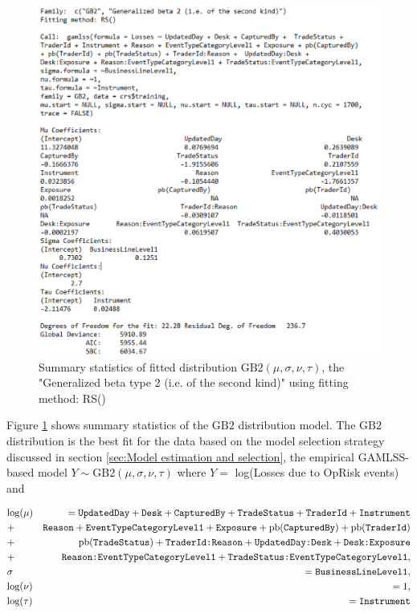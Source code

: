 \documentclass{DissertateUSU}
\begin{document}
\begin{figure}
\centering
\includegraphics[scale=0.9]{mod42GB2.eps}
\caption[Summary of fitted distribution]{Summary statistics of fitted distribution $\mbox{GB}2(\mu,\sigma,\nu,\tau)$, the "Generalized beta type 2 (i.e. of the second kind)" using fitting method: RS()}
\label{SumGB2Anova}
\end{figure}

Figure \ref{SumGB2Anova} shows summary statistics of the \(\mbox{GB}2\)
distribution model. The \(\mbox{GB}2\) distribution is the best fit for
the data based on the model selection strategy discussed in section
\ref{sec:Model estimation and selection}, the empirical GAMLSS-based
model \(Y \sim \mbox{GB}2(\mu,\sigma,\nu,\tau)\) where \(Y=\) log(Losses
due to OpRisk events) and

\small
\singlespacing

\begin{eqnarray}
&\mbox{log}(\mu)& = \mbox{\texttt{UpdatedDay}} + \mbox{\texttt{Desk}} + \mbox{\texttt{CapturedBy}} +  \mbox{\texttt{TradeStatus}} + \mbox{\texttt{TraderId}} + \mbox{\texttt{Instrument}}\nonumber\\
&+& \mbox{\texttt{Reason}} + \mbox{\texttt{EventTypeCategoryLevel1}} + \mbox{\texttt{Exposure}} + \mbox{pb}(\mbox{\texttt{CapturedBy}}) + \mbox{pb}(\mbox{\texttt{TraderId}})\nonumber\\
&+& \mbox{pb}(\mbox{\texttt{TradeStatus}}) + \mbox{\texttt{TraderId:Reason}} +  \mbox{\texttt{UpdatedDay:Desk}} + \mbox{\texttt{Desk:Exposure}}\nonumber\\
&+& \mbox{\texttt{Reason:EventTypeCategoryLevel1}} + \mbox{\texttt{TradeStatus:EventTypeCategoryLevel1}},\nonumber\\
&\sigma& = \mbox{\texttt{BusinessLineLevel1}},\nonumber\\
&\mbox{log}(\nu)& = 1,\nonumber\\
&\mbox{log}(\tau)& = \mbox{\texttt{Instrument}}
\end{eqnarray} \doublespacing \normalsize
\end{document}
